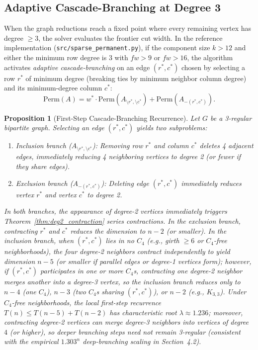 \documentclass[11pt,a4paper]{article}
\newtheorem{proposition}[theorem]{Proposition}
\theoremstyle{definition}
\newcommand{\Perm}{\mathrm{Perm}}
\begin{document}
\subsection{Adaptive Cascade-Branching at Degree 3}

When the graph reductions reach a fixed point where every remaining vertex has degree $\ge 3$, the solver evaluates the frontier cut width. In the reference implementation (\texttt{src/sparse\_permanent.py}), if the component size $k > 12$ and either the minimum row degree is $3$ with $fw > 9$ or $fw > 16$, the algorithm activates \emph{adaptive cascade-branching} on an edge $(r^*, c^*)$ chosen by selecting a row $r^*$ of minimum degree (breaking ties by minimum neighbor column degree) and its minimum-degree column $c^*$:
\begin{equation}
\Perm(A) = w^* \cdot \Perm(A_{\setminus r^*, \setminus c^*}) + \Perm(A_{- (r^*, c^*)}).
\end{equation}

\begin{proposition}[First-Step Cascade-Branching Recurrence]
Let $G$ be a 3-regular bipartite graph. Selecting an edge $(r^*, c^*)$ yields two subproblems:
\begin{enumerate}[leftmargin=*]
    \item \emph{Inclusion branch ($A_{\setminus r^*, \setminus c^*}$):} Removing row $r^*$ and column $c^*$ deletes 4 adjacent edges, immediately reducing 4 neighboring vertices to degree 2 (or fewer if they share edges).
    \item \emph{Exclusion branch ($A_{- (r^*, c^*)}$):} Deleting edge $(r^*, c^*)$ immediately reduces vertex $r^*$ and vertex $c^*$ to degree 2.
\end{enumerate}
In both branches, the appearance of degree-2 vertices immediately triggers Theorem~\ref{thm:deg2_contraction} series contractions. In the exclusion branch, contracting $r^*$ and $c^*$ reduces the dimension to $n - 2$ (or smaller). In the inclusion branch, when $(r^*, c^*)$ lies in no $C_4$ (e.g., girth $\ge 6$ or $C_4$-free neighborhoods), the four degree-2 neighbors contract independently to yield dimension $n - 5$ (or smaller if parallel edges or degree-1 vertices form); however, if $(r^*, c^*)$ participates in one or more $C_4$s, contracting one degree-2 neighbor merges another into a degree-3 vertex, so the inclusion branch reduces only to $n - 4$ (one $C_4$), $n - 3$ (two $C_4$s sharing $(r^*, c^*)$), or $n - 2$ (e.g., $K_{3,3}$). Under $C_4$-free neighborhoods, the local first-step recurrence $T(n) \le T(n - 5) + T(n - 2)$ has characteristic root $\lambda \approx 1.236$; moreover, contracting degree-2 vertices can merge degree-3 neighbors into vertices of degree $4$ (or higher), so deeper branching steps need not remain 3-regular (consistent with the empirical $1.303^n$ deep-branching scaling in Section~4.2).
\end{proposition}
\end{document}
